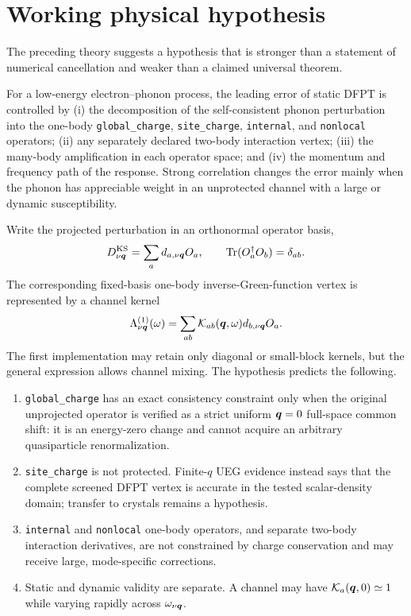 \section{Working physical hypothesis}
\label{sec:hypothesis}

The preceding theory suggests a hypothesis that is stronger than a statement of
numerical cancellation and weaker than a claimed universal theorem.

\begin{keypoint}
For a low-energy electron--phonon process, the leading error of static DFPT is
controlled by (i) the decomposition of the self-consistent phonon perturbation
into the one-body \texttt{global\_charge}, \texttt{site\_charge},
\texttt{internal}, and \texttt{nonlocal} operators; (ii) any separately declared
two-body interaction vertex; (iii) the many-body amplification in each operator
space; and (iv) the momentum and frequency path of the response.  Strong
correlation changes the error mainly when the phonon has appreciable weight in an
unprotected channel with a large or dynamic susceptibility.
\end{keypoint}

Write the projected perturbation in an orthonormal operator basis,
\begin{equation}
  D_{\nu\bm{q}}^{\mathrm{KS}}=\sum_a d_{a,\nu\bm{q}}O_a,
  \qquad
  \operatorname{Tr}(O_a^\dagger O_b)=\delta_{ab}.
  \label{eq:operatorbasis}
\end{equation}
The corresponding fixed-basis one-body inverse-Green-function vertex is
represented by a channel kernel
\begin{equation}
  \Lambda_{\nu\bm{q}}^{(1)}(\omega)
  =\sum_{ab}\mathcal K_{ab}(\bm{q},\omega)
  d_{b,\nu\bm{q}}O_a.
  \label{eq:channelkernel}
\end{equation}
The first implementation may retain only diagonal or small-block kernels, but the
general expression allows channel mixing.  The hypothesis predicts the following.

\begin{enumerate}
  \item \texttt{global\_charge} has an exact consistency constraint only when the
  original unprojected operator is verified as a strict uniform $\bm{q}=0$
  full-space common shift: it is an energy-zero change and cannot acquire an
  arbitrary quasiparticle renormalization.
  \item \texttt{site\_charge} is not protected.  Finite-$q$ UEG evidence instead
  says that the complete screened DFPT vertex is accurate in the tested
  scalar-density domain; transfer to crystals remains a hypothesis.
  \item \texttt{internal} and \texttt{nonlocal} one-body operators, and separate
  two-body interaction derivatives, are not constrained by charge conservation
  and may receive large, mode-specific corrections.
  \item Static and dynamic validity are separate.  A channel may have
  $\mathcal K_a(\bm{q},0)\simeq1$ while varying rapidly across
  $\omega_{\nu\bm{q}}$.
\end{enumerate}

